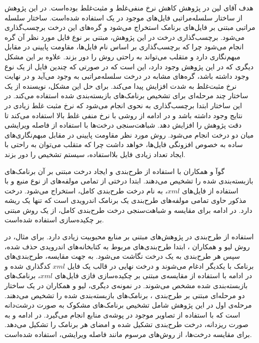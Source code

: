 هدف آقای لین در پژوهش  کاهش نرخ منفی‌غلط و مثبت‌غلط بوده‌است. در این پژوهش از ساختار سلسله‌مراتبی‌ فایل‌های موجود در یک  استفاده شده‌است. ساختار سلسله مراتبی مبتنی بر فایل‌های برنامک استخراج می‌شود و گره‌های این درخت برچسب‌گذاری می‌شود. برچسب‌گذاری درخت در این پژوهش، مبتنی بر نوع فایل‌ مورد نظر آن گره انجام می‌شود چرا که برچسب‌گذاری بر اساس نام فایل‌ها، مقاومت پایینی در مقابل مبهم‌نگاری دارد و متقلب می‌‌تواند به راحتی روش را دور بزند. علاوه بر این مشکل دیگری که در این پژوهش وجود دارد، این است که در صورتی که چندین فایل از یک نوع وجود داشته باشد، گره‌های مشابه در درخت سلسله‌مراتبی به وجود می‌آید و در نهایت نرخ مثبت‌غلط به شدت افزایش پیدا‌ می‌کند. برای حل این مشکل، نویسنده‌ از یک ساختار چند مرحله‌ای برای تشخیص برنامک‌های بازبسته‌بندی شده استفاده می‌کند. در این ساختار ابتدا برچسب‌گذاری به نحوی انجام می‌شود که نرخ مثبت غلط زیادی در نتایج وجود داشته باشد و در ادامه از روشی با نرخ منفی غلط بالا استفاده می‌کند تا دقت پژوهش را افزایش دهد. شباهت‌سنجی درخت‌ها با استفاده از فاصله ویرایشی میان دو درخت انجام می‌شود. روش مورد نظر مقاومت پایینی در مقابل مبهم‌نگاری‌های ساده به خصوص افزونگی فایل‌ها، خواهد داشت چرا که متقلب می‌توان به راحتی با ایجاد تعداد زیادی فایل بلااستفاده، سیستم تشخیص را دور بزند.

گوآ و همکاران با استفاده از طرح‌بندی‌ و ایجاد درخت مبتنی بر آن برنامک‌های بازبسته‌بندی شده را تشخیص می‌دهند. ابتدا درختی از تمامی مولفه‌های از نوع منبع و با استفاده از فایل‌های $xml$، به نام درخت طرح‌بندی کامل‌، استخراج می‌شود. درخت مذکور حاوی تمامی مولفه‌های طرح‌بندی یک برنامک اندرویدی است که تنها یک ریشه دارد. در ادامه برای مقایسه‌ و شباهت‌سنجی درخت طرح‌بندی کامل، از یک روش مبتنی بر چکیده‌سازی  استفاده شده‌است. 

استفاده از طرح‌بندی در پژوهش‌های مبتنی بر منابع محبوبیت زیادی دارد. برای مثال، در روش لیو و همکاران ، ابتدا طرح‌بندی‌های مربوط به کتابخانه‌های اندرویدی حذف شده، سپس هر طرح‌بندی به یک درخت نگاشت می‌شود. به جهت مقایسه، طرح‌بندی‌های برنامک با یکدیگر ادغام می‌شوند و درخت نهایی در قالب یک فایل $xml$ کدگذاری شده و در ادامه با استفاده از مقایسه‌ی مبتنی بر چکیده‌سازی فازی فایل‌های $xml$، برنامک‌های بازبسته‌بندی شده مشخص می‌شوند. در نمونه‌ی دیگری، لیو و همکاران در یک ساختار دو مرحله‌ای مبتنی بر طرح‌بندی ، برنامک‌های بازبسته‌بندی شده را تشخیص می‌دهند. مرحله‌ی اول در این پژوهش شامل تشخیص برنامک‌های مشکوک به صورت درشت‌دانه‌ است که با استفاده از تصاویر موجود در پوشه‌ی منابع انجام می‌گیرد. در ادامه و به صورت ریز‌دانه، درخت طرح‌بندی تشکیل شده و امضا‌ی هر برنامک را تشکیل‌ می‌دهد. برای مقایسه درخت‌ها، از روش‌های مرسوم مانند فاصله ویرایشی، استفاده شده‌است.

